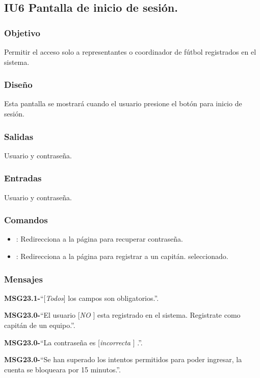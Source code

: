 
\subsection{IU6 Pantalla de inicio de sesión.}

\subsubsection{Objetivo}
	Permitir el acceso solo a representantes o coordinador de fútbol registrados en el sistema.

\subsubsection{Diseño}
	Esta pantalla se mostrará cuando el usuario presione el botón para inicio de sesión.


\subsubsection{Salidas}

	Usuario y contraseña.

\subsubsection{Entradas}
	Usuario y contraseña.

\subsubsection{Comandos}
\begin{itemize}
	\item {}: Redirecciona a la página para recuperar contraseña.
	\item {}: Redirecciona a la página para registrar a un capitán. seleccionado.
\end{itemize}

\subsubsection{Mensajes}
	\begin{Citemize}
		\item {\bf MSG23.1-}``[{\em Todos}] los campos son obligatorios.''.
		\item {\bf MSG23.0-}``El usuario [{\em NO }] esta registrado en el sistema. Registrate como capitán de un equipo.''.
		\item {\bf MSG23.0-}``La contraseña es [{\em incorrecta }] .''.
		\item {\bf MSG23.0-}``Se han superado los intentos permitidos para poder ingresar, la cuenta se bloqueara por 15 minutos.''.
	\end{Citemize}
	
